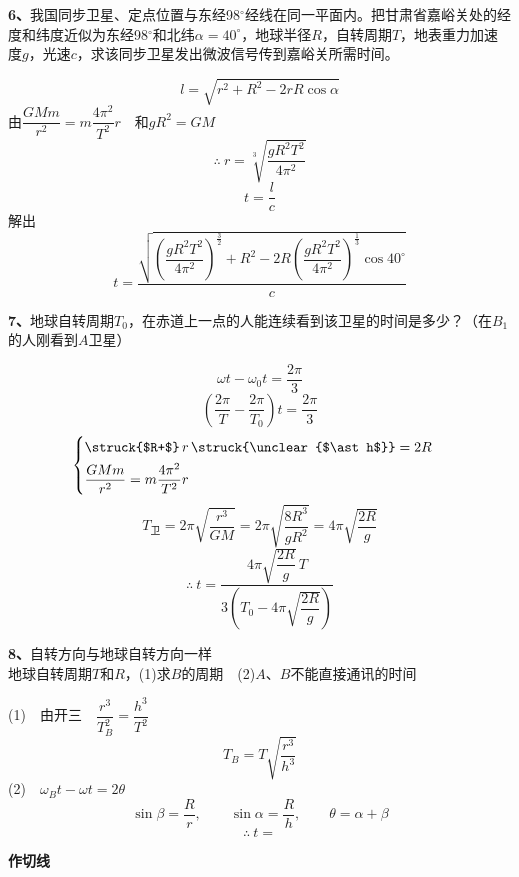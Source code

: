 \begin{problem}[6]
\textbf{6、}我国同步卫星、定点位置与东经98$^\circ$经线在同一平面内。把甘肃省嘉峪关处的经度和纬度近似为东经98$^\circ$和北纬$\alpha=40^\circ$，地球半径$R$，自转周期$T$，地表重力加速度$g$，光速$c$，求该同步卫星发出微波信号传到嘉峪关所需时间。%
\begin{solution}
\[ l=\sqrt{r^2+R^2-2rR\cos\alpha} \]
由$\dfrac{GMm}{r^2}=m\dfrac{4\pi^2}{T^2}r$　和$gR^2=GM$
\[ \therefore\ r=\sqrt[3]{\dfrac{gR^2T^2}{4\pi^2}} \]
\[ t=\dfrac{l}{c} \]
解出
\[ t=\dfrac{\sqrt{\left(\dfrac{gR^2T^2}{4\pi^2}\right)^{\frac{3}{2}}+R^2-2R\left(\dfrac{gR^2T^2}{4\pi^2}\right)^{\frac{1}{3}}\cos 40^\circ}}{c} \] %
\end{solution}
\end{problem}
\begin{problem}[7]
\textbf{7、}地球自转周期$T_0$，在赤道上一点的人能连续看到该卫星的时间是多少？（在$B_1$的人刚看到$A$卫星）
\begin{solution}
\[ \omega t-\omega_0 t=\dfrac{2\pi}{3} \]
\[ \left(\dfrac{2\pi}{T}-\dfrac{2\pi}{T_0}\right)t=\dfrac{2\pi}{3} \]
\[ \begin{cases}
\text{\struck{$R+$}}\,r\,\text{\struck{\unclear{$\ast h$}}}=2R\\[4pt]
\dfrac{GMm}{r^2}=m\dfrac{4\pi^2}{T^2}r
\end{cases} \] %
\[ T_{\text{卫}}=2\pi\sqrt{\dfrac{r^3}{GM}}=2\pi\sqrt{\dfrac{8R^3}{gR^2}}=4\pi\sqrt{\dfrac{2R}{g}} \] %
\noindent{} %
\[ \therefore\ t=\dfrac{4\pi\sqrt{\dfrac{2R}{g}}\,T}{3\left(T_0-4\pi\sqrt{\dfrac{2R}{g}}\right)} \] %
\end{solution}
\end{problem}
\begin{problem}[8]
\textbf{8、}自转方向与地球自转方向一样\\
地球自转周期$T$和$R$，(1)求$B$的周期　(2)$A$、$B$不能直接通讯的时间%
\begin{solution}
(1)　由开三　$\dfrac{r^3}{T_B^2}=\dfrac{h^3}{T^2}$
\[ T_B=T\sqrt{\dfrac{r^3}{h^3}} \]
(2)　$\omega_B t-\omega t=2\theta$
\[ \sin\beta=\dfrac{R}{r},\qquad \sin\alpha=\dfrac{R}{h},\qquad \theta=\alpha+\beta \]
\[ \therefore\ t= \]
\end{solution}
\end{problem}
\textbf{作切线}

